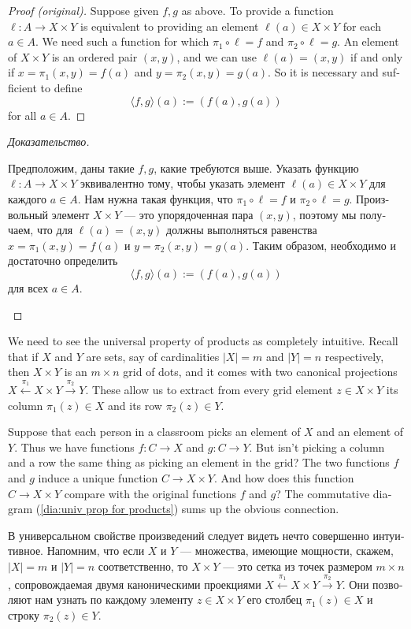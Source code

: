 \documentclass[a4paper]{book}
\def\to{\rightarrow}
\def\taking{\colon}
\def\la{\langle}
\def\ra{\rangle}
\newcommand{\To}[1]{\xrightarrow{#1}}
\newcommand{\From}[1]{\xleftarrow{#1}}
\newcommand{\prodmap}[2]{\la#1,#2\ra}
\theoremstyle{myth}
\newtheorem{exampleENG}[envENG]{\begin{english}Example\end{english}}
\newenvironment{proofENG}{\begin{proof}[Proof (original)]}{\end{proof}}
\newtheorem{exampleRUS}[envRUS]{\begin{russian}Пример\end{russian}}
\newenvironment{proofRUS}{\begin{proof}[Доказательство]}{\end{proof}}
\begin{document}
\begin{english}
\begin{proofENG}
Suppose given $f,g$ as above. To provide a function $\ell\taking A\to X\times Y$ is equivalent to providing an element $\ell(a)\in X\times Y$ for each $a\in A$. We need such a function for which $\pi_1\circ \ell=f$ and $\pi_2\circ \ell=g$. An element of $X\times Y$ is an ordered pair $(x,y)$, and we can use $\ell(a)=(x,y)$ if and only if $x=\pi_1(x,y)=f(a)$ and $y=\pi_2(x,y)=g(a)$. So it is necessary and sufficient to define $$\prodmap{f}{g}(a):=(f(a),g(a))$$ for all $a\in A$.
\end{proofENG}

\begin{proofRUS}
\begin{russian}Предположим, даны такие $f,g$, какие требуются выше. Указать функцию $\ell\taking A\to X\times Y$ эквивалентно тому, чтобы указать элемент $\ell(a)\in X\times Y$ для каждого $a\in A$. Нам нужна такая функция, что $\pi_1\circ \ell=f$ и $\pi_2\circ \ell=g$. Произвольный элемент $X\times Y$ — это упорядоченная пара $(x,y)$, поэтому мы получаем, что для $\ell(a)=(x,y)$ должны выполняться равенства $x=\pi_1(x,y)=f(a)$ и $y=\pi_2(x,y)=g(a)$. Таким образом, необходимо и достаточно определить $$\prodmap{f}{g}(a):=(f(a),g(a))$$ для всех $a\in A$.\end{russian}
\end{proofRUS}

\begin{exampleENG}\label{ex:grid2}
We need to see the universal property of products as completely intuitive. Recall that if $X$ and $Y$ are sets, say of cardinalities $|X|=m$ and $|Y|=n$ respectively, then $X\times Y$ is an $m\times n$ grid of dots, and it comes with two canonical projections $X\From{\pi_1}X\times Y\To{\pi_2}Y$. These allow us to extract from every grid element $z\in X\times Y$ its column $\pi_1(z)\in X$ and its row $\pi_2(z)\in Y$.

Suppose that each person in a classroom picks an element of $X$ and an element of $Y$. Thus we have functions $f\taking C\to X$ and $g\taking C\to Y$. But isn't picking a column and a row the same thing as picking an element in the grid? The two functions $f$ and $g$ induce a unique function $C\to X\times Y$. And how does this function $C\to X\times Y$ compare with the original functions $f$ and $g$? The commutative diagram (\ref{dia:univ prop for products}) sums up the obvious connection. 
\end{exampleENG}

\begin{exampleRUS}\label{ex:grid2}
\begin{russian}В универсальном свойстве произведений следует видеть нечто совершенно интуитивное. Напомним, что если $X$ и $Y$ — множества, имеющие мощности, скажем, $|X|=m$ и $|Y|=n$ соответственно, то $X\times Y$ — это сетка из точек размером $m\times n$, сопровождаемая двумя каноническими проекциями $X\From{\pi_1}X\times Y\To{\pi_2}Y$. Они позволяют нам узнать по каждому элементу $z\in X\times Y$ его столбец $\pi_1(z)\in X$ и строку $\pi_2(z)\in Y$.


\end{russian}
\end{exampleRUS}
\end{english}
\end{document}
